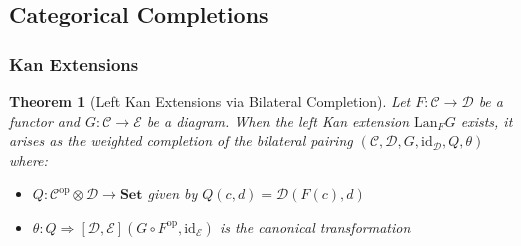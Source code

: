 \documentclass[11pt]{article}
\theoremstyle{plain}
\newtheorem{theorem}{Theorem}[section]
\theoremstyle{definition}
\theoremstyle{remark}
\newcommand{\C}{\mathcal{C}}
\newcommand{\D}{\mathcal{D}}
\newcommand{\E}{\mathcal{E}}
\newcommand{\op}{\mathrm{op}}
\begin{document}
\subsection{Categorical Completions}

\subsubsection{Kan Extensions}

\begin{theorem}[Left Kan Extensions via Bilateral Completion]\label{thm:kan-extension-bilateral}
Let $F : \C \to \D$ be a functor and $G : \C \to \E$ be a diagram. When the left Kan extension $\text{Lan}_F G$ exists, it arises as the weighted completion of the bilateral pairing $(\C, \D, G, \text{id}_\D, Q, \theta)$ where:
\begin{itemize}
\item $Q : \C^{\op} \otimes \D \to \mathbf{Set}$ given by $Q(c, d) = \D(F(c), d)$
\item $\theta : Q \Rightarrow [\D, \E](G \circ F^{\op}, \text{id}_\E)$ is the canonical transformation
\end{itemize}
\end{theorem}
\end{document}
